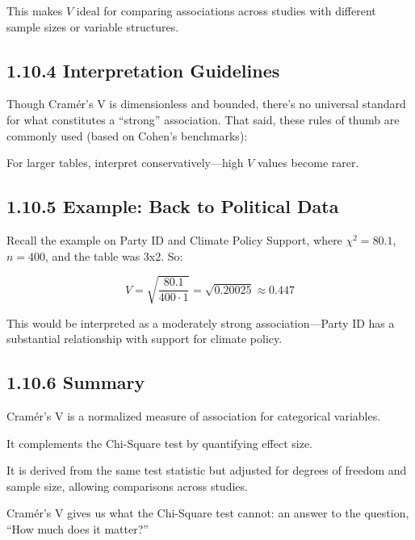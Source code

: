 \documentclass[12pt]{article}
\begin{document}
This makes \(V\) ideal for comparing associations across studies with different sample sizes or variable structures.

\subsection*{1.10.4 Interpretation Guidelines}

Though Cramér’s V is dimensionless and bounded, there’s no universal standard for what constitutes a “strong” association. That said, these rules of thumb are commonly used (based on Cohen’s benchmarks):

For larger tables, interpret conservatively—high \(V\) values become rarer.

\subsection*{1.10.5 Example: Back to Political Data}

Recall the example on Party ID and Climate Policy Support, where \(\chi^2 = 80.1\), \(n = 400\), and the table was 3x2. So:

\[
V = \sqrt{\frac{80.1}{400 \cdot 1}} = \sqrt{0.20025} \approx 0.447
\]

This would be interpreted as a moderately strong association—Party ID has a substantial relationship with support for climate policy.

\subsection*{1.10.6 Summary}

Cramér’s V is a normalized measure of association for categorical variables.

It complements the Chi-Square test by quantifying effect size.

It is derived from the same test statistic but adjusted for degrees of freedom and sample size, allowing comparisons across studies.

Cramér’s V gives us what the Chi-Square test cannot: an answer to the question, “How much does it matter?”
\end{document}
